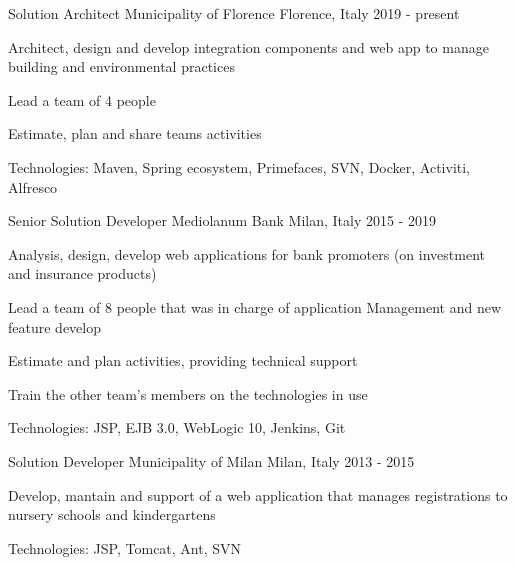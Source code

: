 

\begin{cventries}

  \cventry
    {Solution Architect} %
    {Municipality of Florence} %
    {Florence, Italy} %
    {2019 - present} %
    {
      \begin{cvitems} %
        \item {Architect, design and develop integration components and web app to manage building and environmental practices}
        \item {Lead a team of 4 people}
        \item {Estimate, plan and share teams activities}
        \item {Technologies: Maven, Spring ecosystem, Primefaces, SVN, Docker, Activiti, Alfresco}
      \end{cvitems}
    }

  \cventry
    {Senior Solution Developer} %
    {Mediolanum Bank} %
    {Milan, Italy} %
    {2015 - 2019} %
    {
      \begin{cvitems} %
        \item {Analysis, design, develop web applications for bank promoters (on investment and insurance products) }
        \item {Lead a team of 8 people that was in charge of application Management and new feature develop}
        \item {Estimate and plan activities, providing technical support}
        \item {Train the other team's members on the technologies in use}
        \item {Technologies: JSP, EJB 3.0, WebLogic 10, Jenkins, Git}
      \end{cvitems}
    }

  \cventry
    {Solution Developer} %
    {Municipality of Milan} %
    {Milan, Italy} %
    {2013 - 2015} %
    {
      \begin{cvitems} %
        \item {Develop, mantain and support of a web application that manages registrations to nursery schools and kindergartens}
        \item {Technologies: JSP, Tomcat, Ant, SVN}
      \end{cvitems}
    }


\end{cventries}

